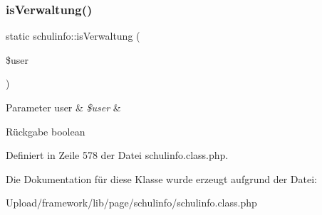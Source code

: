 \subsubsection{\texorpdfstring{is\+Verwaltung()}{isVerwaltung()}}
{\footnotesize\ttfamily static schulinfo\+::is\+Verwaltung (\begin{DoxyParamCaption}\item[{}]{\$user }\end{DoxyParamCaption})\hspace{0.3cm}{\ttfamily [static]}}


\begin{DoxyParams}[1]{Parameter}
user & {\em \$user} & \\
\hline
\end{DoxyParams}
\begin{DoxyReturn}{Rückgabe}
boolean 
\end{DoxyReturn}


Definiert in Zeile 578 der Datei schulinfo.\+class.\+php.



Die Dokumentation für diese Klasse wurde erzeugt aufgrund der Datei\+:\begin{DoxyCompactItemize}
\item 
Upload/framework/lib/page/schulinfo/schulinfo.\+class.\+php\end{DoxyCompactItemize}
